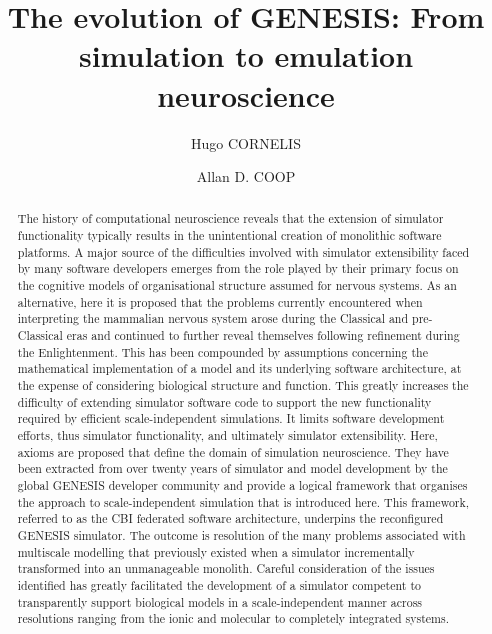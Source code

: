 \documentclass[11pt,3p,twocolumn]{JMN}
\begin{document}
\pagestyle{fancy}
\fancyhf{}
\rfoot{\thepage}

\begin{frontmatter}

\title{The evolution of GENESIS: From simulation to emulation neuroscience}

\author[a,1]{Hugo CORNELIS} 
\author[b]{Allan D. COOP} 

\address[a]{\noindent Neurospaces Development, Daniëlstraat 27, 3500 Hasselt, BELGIUM}

\address[b]{Three Way Street, PO Box 140, Grenfell, 2801 NSW, AUSTRALIA\vspace{0.5cm}}

\address[1]{Corresponding author: {\bf hugo.cornelis@google.com}}

\begin{abstract}
The history of computational neuroscience reveals that the extension of simulator functionality typically results in the unintentional creation of monolithic software platforms.  A major source of the difficulties involved with simulator extensibility faced by many software developers emerges from the role played by their primary focus on the cognitive models of organisational structure assumed for nervous systems. As an alternative, here it is proposed that the problems currently encountered when interpreting the mammalian nervous system arose during the Classical and pre-Classical eras and continued to further reveal themselves following refinement during the Enlightenment. This has been compounded by assumptions concerning the mathematical implementation of a model and its underlying software architecture, at the expense of considering biological structure and function. This greatly increases the difficulty of extending simulator software code to support the new functionality required by efficient scale-independent simulations.  It limits software development efforts, thus simulator functionality, and ultimately simulator extensibility. Here, axioms are proposed that define the domain of simulation neuroscience. They have been extracted from over twenty years of simulator and model development by the global GENESIS developer community and provide a logical framework that organises the approach to scale-independent simulation that is introduced here. This framework, referred to as the CBI federated software architecture, underpins the reconfigured GENESIS simulator.  The outcome is resolution of the many problems associated with multiscale modelling that previously existed when a simulator incrementally transformed into an unmanageable monolith. Careful consideration of the issues identified has greatly facilitated the development of a simulator competent to transparently support biological models in a scale-independent manner across resolutions ranging from the ionic and molecular to completely integrated systems.
\end{abstract}


\end{frontmatter}
\end{document}

